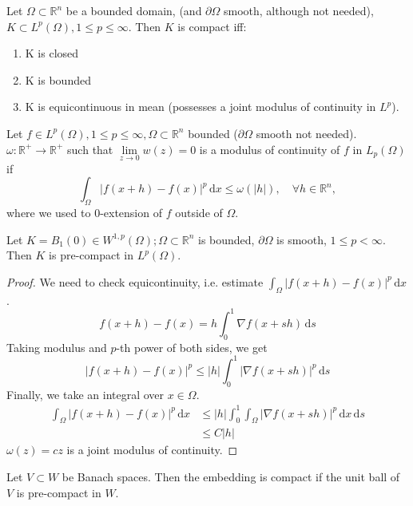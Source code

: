 \documentclass{report}
\begin{document}
{
    Let \(\Omega \subset \mathbb{R}^{n}\) be a bounded domain, (and \(\partial \Omega\) smooth, although not needed), \(K \subset L^{p}(\Omega), 1 \leq p \leq \infty\). Then \(K\) is compact iff:
    \begin{enumerate}
        \item K is closed
        \item K is bounded
        \item K is equicontinuous in mean (possesses a joint modulus of continuity in \(L^p\)).
    \end{enumerate} 
}

\dfn{}
{
    Let \(f \in L^p(\Omega), 1 \leq p \leq \infty, \Omega \subset \mathbb{R}^{n}\) bounded (\(\partial \Omega\) smooth not needed). \(\omega \colon \mathbb{R}^{+} \to \mathbb{R}^{+}\) such that \(\lim\limits_{z \to 0} w(z) = 0\) is a modulus of continuity of \(f\) in \(L_{p}(\Omega)\) if 
    \[
        \int_{\Omega} \vert f(x+h) - f(x) \vert ^p \,\mathrm{d}x \leq \omega(\vert h \vert ), \quad \forall h \in \mathbb{R}^n,
    \]
    where we used to \(0\)-extension of \(f\) outside of \(\Omega\). 
}

\cor{}
{
    Let \(K = B_{1}(0) \in W^{1, p}(\Omega); \Omega \subset \mathbb{R}^{n}\) is bounded, \(\partial \Omega\) is smooth, \(1 \leq p < \infty\). Then \(K\) is pre-compact in \(L^{p}(\Omega)\).
}

\begin{proof}
    We need to check equicontinuity, i.e. estimate \(\int_{\Omega} \vert f(x+h) - f(x) \vert ^p \,\mathrm{d}x \).
    \[
        f(x+h) - f(x) = h \int_{0}^{1} \nabla f(x + sh) \,\mathrm{d}s  
    \]
    Taking modulus and \(p\)-th power of both sides, we get
    \[
        \vert f(x+h) - f(x) \vert ^p \leq \vert h \vert \int_{0}^{1} \vert \nabla f(x + sh) \vert ^p \,\mathrm{d}s 
    \]
    Finally, we take an integral over \(x \in \Omega\).
    \begin{align*}
        \int_{\Omega} \vert f(x+h) - f(x) \vert ^p \,\mathrm{d}x &\leq \vert h \vert \int_{0}^{1} \int_{\Omega}  \vert \nabla f(x + sh) \vert ^p \,\mathrm{d}x \,\mathrm{d}s \\
        &\leq C \vert h \vert
    \end{align*}
    \(\omega(z) = cz\) is a joint modulus of continuity.
\end{proof}

\dfn{}
{
    Let \(V \subset  W\) be Banach spaces. Then the embedding is compact if the unit ball of \(V\) is pre-compact in \(W\).
}
\end{document}
